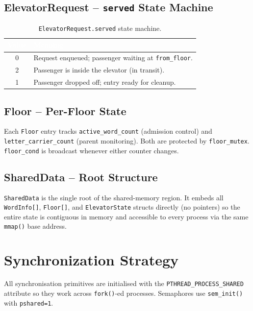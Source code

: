 \documentclass[12pt,a4paper]{article}
\newcommand{\code}[1]{\texttt{\small #1}}
\begin{document}
\subsection{ElevatorRequest -- \texttt{served} State Machine}

\begin{table}[h!]
\centering
\caption{\texttt{ElevatorRequest.served} state machine.}
\begin{tabular}{cl}
\toprule
\rowcolor{darkblue}
\textcolor{white}{\textbf{Value}} & \textcolor{white}{\textbf{Meaning}} \\
\midrule
0 & Request enqueued; passenger waiting at \texttt{from\_floor}. \\
\rowcolor{rowgray}
2 & Passenger is inside the elevator (in transit). \\
1 & Passenger dropped off; entry ready for cleanup. \\
\bottomrule
\end{tabular}
\end{table}

\subsection{Floor -- Per-Floor State}

Each \code{Floor} entry tracks \code{active\_word\_count} (admission control) and
\code{letter\_carrier\_count} (parent monitoring). Both are protected by
\code{floor\_mutex}. \code{floor\_cond} is broadcast whenever either counter changes.

\subsection{SharedData -- Root Structure}

\code{SharedData} is the single root of the shared-memory region. It embeds all
\code{WordInfo[]}, \code{Floor[]}, and \code{ElevatorState} structs directly (no
pointers) so the entire state is contiguous in memory and accessible to every
process via the same \code{mmap()} base address.

\section{Synchronization Strategy}

All synchronisation primitives are initialised with the
\code{PTHREAD\_PROCESS\_SHARED} attribute so they work across \code{fork()}-ed
processes. Semaphores use \code{sem\_init()} with \code{pshared=1}.
\end{document}
